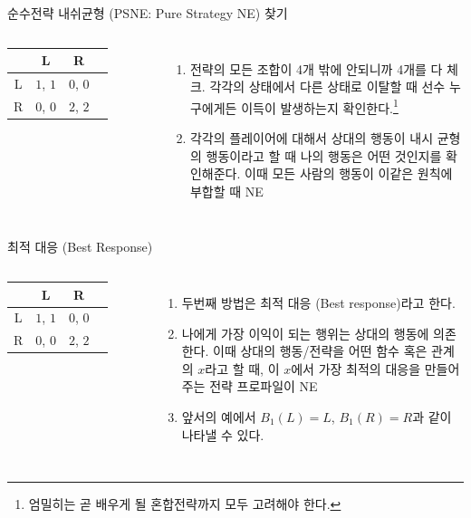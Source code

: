 \documentclass[final]{beamer}
\begin{document}
\begin{frame}[t]{순수전략 내쉬균형 (PSNE: Pure Strategy NE) 찾기}
	\begin{columns}
			\begin{table}
			\begin{tabular}{|c|c|c|c|} \hline
			& {L} &  {R}\\ \hline
			{L} & {$1$}, {$1$} & {$0$}, {$0$} \\ \hline%
			{R} & {$0$}, {$0$}  & {$2$}, {$2$}\\ 
			\hline
			\end{tabular}
			\end{table}
		\begin{enumerate}
			\item 전략의 모든 조합이 4개 밖에 안되니까 4개를 다 체크. 각각의 상태에서 다른 상태로 이탈할 때 선수 누구에게든 이득이 발생하는지 확인한다.\footnote{엄밀히는 곧 배우게 될 혼합전략까지 모두 고려해야 한다.}
			\item 각각의 플레이어에 대해서 상대의 행동이 내시 균형의 행동이라고 할 때 나의 행동은 어떤 것인지를 확인해준다. 이때 모든 사람의 행동이 이같은 원칙에 부합할 때 NE
		\end{enumerate}
	\end{columns}
\end{frame}

\begin{frame}[t]{최적 대응 (Best Response)}
	\begin{columns}
		\column{.4\textwidth}
			\begin{table}
			\begin{tabular}{|c|c|c|c|} \hline
			& {L} &  {R}\\ \hline
			{L} & {$1$}, {$1$} & {$0$}, {$0$} \\ \hline%
			{R} & {$0$}, {$0$}  & {$2$}, {$2$}\\ 
			\hline
			\end{tabular}
			\end{table}
		\column{.6\textwidth}
		\begin{enumerate}
			\item 두번째 방법은 최적 대응 (Best response)라고 한다. 
			\item 나에게 가장 이익이 되는 행위는 상대의 행동에 의존한다. 이때 상대의 행동/전략을 어떤 함수 혹은 관계의 $x$라고 할 때, 이 $x$에서 가장 최적의 대응을 만들어주는 전략 프로파일이 NE
			\item 앞서의 예에서 $B_1(L)=L$, $B_1(R)=R$과 같이 나타낼 수 있다.
		\end{enumerate}
	\end{columns}
\end{frame}
\end{document}
